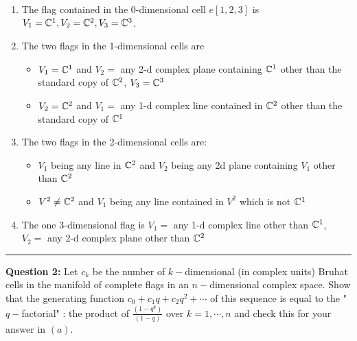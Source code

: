 \documentclass[11pt]{article}
\begin{document}
\begin{enumerate}[label=(\alph*)]
  \item The flag contained in the 0-dimensional cell $e[1,2,3]$ is $V_1 = \mathbb{C}^1, V_2 = \mathbb{C}^2, V_3 = \mathbb{C}^3$. 
  \\
  \item The two flags in the 1-dimensional cells are 
  \begin{itemize}
    \item $V_1 = \mathbb{C}^1$ and $V_2 = $ any 2-d complex plane containing $\mathbb{C}^1$ other than the standard copy of $\mathbb{C}^2$, $V_3 = \mathbb{C}^3$
    \item $V_2 = \mathbb{C}^2$ and $V_1 = $ any 1-d complex line contained in $\mathbb{C}^2$ other than the standard copy of $\mathbb{C}^1$ 
  \end{itemize}
  \vskip 0.5cm
  \item The two flags in the 2-dimensional cells are:
  \begin{itemize}
    \item $V_1$ being any line in $\mathbb{C}^2$ and $V_2$ being any 2d plane containing $V_1$ other than $\mathbb{C}^2$
    \item $V^2 \neq \mathbb{C}^2$ and $V_1$ being any line contained in $V^2$ which is not $\mathbb{C}^1$
  \end{itemize}
  \vskip 0.5cm
  \item The one 3-dimensional flag is $V_1 = $ any 1-d complex line other than $\mathbb{C}^1$, $V_2 = $ any 2-d complex plane other than $\mathbb{C}^2$
\end{enumerate}

\vskip 0.5cm
\hrule
\pagebreak





\begin{bluebox}
  \textbf{Question 2:} 
  Let $c_k$ be the number of $k-$dimensional (in complex units) Bruhat cells in the manifold of complete flags in an $n-$dimensional complex space. Show that the generating function $c_0 + c_1 q + c_2 q^2 + \cdots$ of this sequence is equal to the "$q-$factorial" : the product of $\frac{(1-q^k)}{(1-q)}$ over $k=1,\cdots, n$ and check this for your answer in $(a)$.
\end{bluebox}
\end{document}
